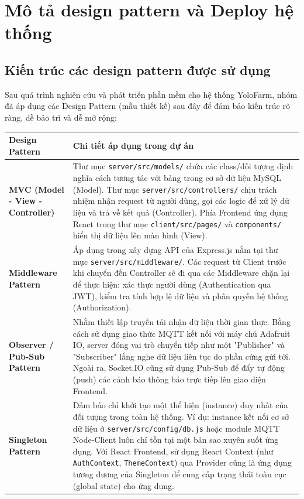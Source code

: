 \section{Mô tả design pattern và Deploy hệ thống}
\subsection{Kiến trúc các design pattern được sử dụng}
\indent Sau quá trình nghiên cứu và phát triển phần mềm cho hệ thống YoloFarm, nhóm đã áp dụng các Design Pattern (mẫu thiết kế) sau đây để đảm bảo kiến trúc rõ ràng, dễ bảo trì và dễ mở rộng:
\begin{longtable}{|P{4.8cm}|m{10cm}|}\hline
    \hline
    \textbf{Design Pattern} & \centering\arraybackslash\textbf{Chi tiết áp dụng trong dự án} \\
    \hline

    \textbf{MVC (Model - View - Controller)} & Thư mục \texttt{server/src/models/} chứa các class/đối tượng định nghĩa cách tương tác với bảng trong cơ sở dữ liệu MySQL (Model). Thư mục \texttt{server/src/controllers/} chịu trách nhiệm nhận request từ người dùng, gọi các logic để xử lý dữ liệu và trả về kết quả (Controller). Phía Frontend ứng dụng React trong thư mục \texttt{client/src/pages/} và \texttt{components/} hiển thị dữ liệu lên màn hình (View). \\
    \hline
    \textbf{Middleware Pattern} & Áp dụng trong xây dựng API của Express.js nằm tại thư mục \texttt{server/src/middleware/}. Các request từ Client trước khi chuyển đến Controller sẽ đi qua các Middleware chặn lại để thực hiện: xác thực người dùng (Authentication qua JWT), kiểm tra tính hợp lệ dữ liệu và phân quyền hệ thống (Authorization). \\
    \hline
    \textbf{Observer / Pub-Sub Pattern} & Nhằm thiết lập truyền tải nhận dữ liệu thời gian thực. Bằng cách sử dụng giao thức MQTT kết nối với máy chủ Adafruit IO, server đóng vai trò chuyển tiếp như một "Publisher" và "Subscriber" lắng nghe dữ liệu liên tục do phần cứng gửi tới. Ngoài ra, Socket.IO cũng sử dụng Pub-Sub để đẩy tự động (push) các cảnh báo thông báo trực tiếp lên giao diện Frontend. \\
    \hline
    \textbf{Singleton Pattern} & Đảm bảo chỉ khởi tạo một thể hiện (instance) duy nhất của đối tượng trong toàn hệ thống. Ví dụ: instance kết nối cơ sở dữ liệu ở \texttt{server/src/config/db.js} hoặc module MQTT Node-Client luôn chỉ tồn tại một bản sao xuyên suốt ứng dụng. Với React Frontend, sử dụng React Context (như \texttt{AuthContext}, \texttt{ThemeContext}) qua Provider cũng là ứng dụng tương đương của Singleton để cung cấp trạng thái toàn cục (global state) cho ứng dụng. \\\hline
\end{longtable}
